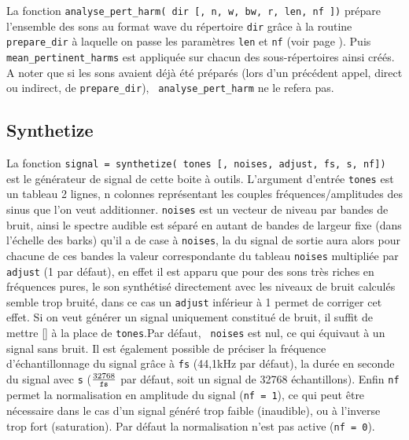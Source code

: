     La fonction {\tt analyse\_pert\_harm( dir [, n, w, bw, r, len, nf
    ])} pr{\'e}pare l'ensemble des sons au format wave du r{\'e}pertoire
    {\tt dir} gr{\^a}ce {\`a} la routine {\tt prepare\_dir} {\`a} laquelle on
    passe les param{\`e}tres {\tt len} et {\tt nf} (voir page
    \pageref{preparedir}). Puis {\tt mean\_pertinent\_harms} est
    appliqu{\'e}e sur chacun des sous-r{\'e}pertoires ainsi cr{\'e}{\'e}s. A noter
    que si les sons avaient d{\'e}j{\`a} {\'e}t{\'e} pr{\'e}par{\'e}s (lors d'un pr{\'e}c{\'e}dent
    appel, direct ou indirect, de {\tt prepare\_dir}), {\tt
    analyse\_pert\_harm} ne le refera pas.


    \newpage
    \subsection{Synthetize}
    \label{synthetize}
    La fonction {\tt signal = synthetize( tones [, noises, adjust, fs, s, nf])}
    est le g{\'e}n{\'e}rateur de signal de cette boite {\`a} outils.
    L'argument d'entr{\'e}e {\tt tones} est un tableau 2 lignes, n
    colonnes repr{\'e}sentant les couples fr{\'e}quences/amplitudes des
    sinus que l'on veut additionner. {\tt noises} est un vecteur
    de niveau par bandes de bruit, ainsi le spectre audible est
    s{\'e}par{\'e} en autant de bandes de largeur fixe (dans l'{\'e}chelle des
    barks) qu'il a de case {\`a} {\tt noises}, la \dsp du signal de
    sortie aura alors pour chacune de ces bandes la valeur
    correspondante du tableau {\tt noises} multipli{\'e}e par {\tt adjust}
    (1 par d{\'e}faut), en effet il est apparu que pour des sons tr{\`e}s riches
    en fr{\'e}quences pures, le son synth{\'e}tis{\'e} directement avec les niveaux de bruit
    calcul{\'e}s semble trop bruit{\'e}, dans ce cas un {\tt adjust} inf{\'e}rieur {\`a} 1 permet
    de corriger cet effet. Si on veut g{\'e}n{\'e}rer un signal
    uniquement constitu{\'e} de bruit, il suffit de mettre [] {\`a} la place de
    {\tt tones}.Par d{\'e}faut, {\tt
    noises} est nul, ce qui {\'e}quivaut {\`a} un signal sans bruit. Il
    est {\'e}galement possible de pr{\'e}ciser la fr{\'e}quence d'{\'e}chantillonnage du
    signal gr{\^a}ce {\`a} {\tt fs} (44,1kHz par d{\'e}faut), la dur{\'e}e en
    seconde du signal avec {\tt s} ($\frac{32768}{\tt fs}$ par
    d{\'e}faut, soit un signal de 32768 {\'e}chantillons). Enfin {\tt nf}
    permet la normalisation en amplitude du signal ({\tt nf = 1}),
    ce qui peut {\^e}tre n{\'e}cessaire dans le cas d'un signal g{\'e}n{\'e}r{\'e}
    trop faible (inaudible), ou {\`a} l'inverse trop fort
    (saturation). Par d{\'e}faut la normalisation n'est pas active
    ({\tt nf = 0}).\\


